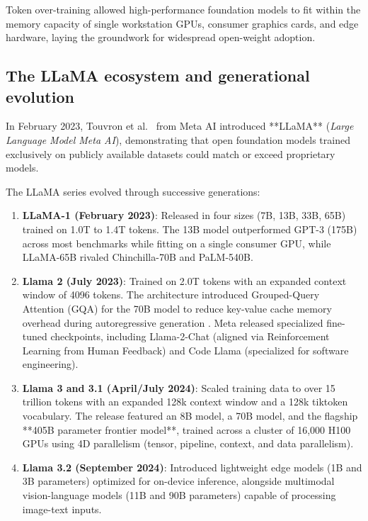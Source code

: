 \documentclass[../../../main.tex]{subfiles}
\begin{document}
Token over-training allowed high-performance foundation models to fit within the memory capacity of single workstation GPUs, consumer graphics cards, and edge hardware, laying the groundwork for widespread open-weight adoption.


\subsection{The LLaMA ecosystem and generational evolution}
\label{subsec:llama_family}

In February 2023, Touvron et al.~\cite{touvron2023llama} from Meta AI introduced **LLaMA** (\emph{Large Language Model Meta AI}), demonstrating that open foundation models trained exclusively on publicly available datasets could match or exceed proprietary models.

The LLaMA series evolved through successive generations:
\begin{enumerate}
    \item \textbf{LLaMA-1 (February 2023)}: Released in four sizes (7B, 13B, 33B, 65B) trained on 1.0T to 1.4T tokens. The 13B model outperformed GPT-3 (175B) across most benchmarks while fitting on a single consumer GPU, while LLaMA-65B rivaled Chinchilla-70B and PaLM-540B.
    
    \item \textbf{Llama 2 (July 2023)}: Trained on 2.0T tokens with an expanded context window of 4096 tokens. The architecture introduced Grouped-Query Attention (GQA) for the 70B model to reduce key-value cache memory overhead during autoregressive generation \cite{touvron2023llama2}. Meta released specialized fine-tuned checkpoints, including Llama-2-Chat (aligned via Reinforcement Learning from Human Feedback) and Code Llama (specialized for software engineering).
    
    \item \textbf{Llama 3 and 3.1 (April/July 2024)}: Scaled training data to over 15 trillion tokens with an expanded 128k context window and a 128k tiktoken vocabulary. The release featured an 8B model, a 70B model, and the flagship **405B parameter frontier model**, trained across a cluster of 16,000 H100 GPUs using 4D parallelism (tensor, pipeline, context, and data parallelism).
    
    \item \textbf{Llama 3.2 (September 2024)}: Introduced lightweight edge models (1B and 3B parameters) optimized for on-device inference, alongside multimodal vision-language models (11B and 90B parameters) capable of processing image-text inputs.
\end{enumerate}
\end{document}
